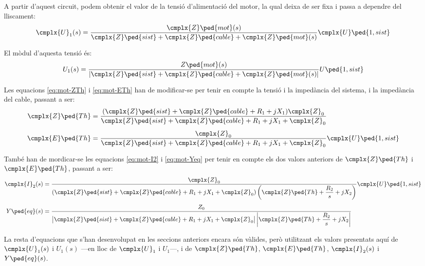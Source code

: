 A partir d'aquest circuit, podem obtenir  el valor de la tensió d'alimentació del motor, la qual deixa de ser fixa i passa a dependre del  lliscament:
\begin{equation}
	\cmplx{U}_1(s) = \frac{\cmplx{Z}\ped{mot}(s)}{\cmplx{Z}\ped{sist} + \cmplx{Z}\ped{cable} +  \cmplx{Z}\ped{mot}(s)} \cmplx{U}\ped{1,sist}\label{eq:mot-U-redu}
\end{equation}

El mòdul d'aquesta tensió és:
\begin{equation}
	U_1(s) = \frac{Z\ped{mot}(s)}{|\cmplx{Z}\ped{sist} + \cmplx{Z}\ped{cable} +  \cmplx{Z}\ped{mot}(s)|} U\ped{1,sist}
\end{equation}

Les equacions \eqref{eq:mot-ZTh} i  \eqref{eq:mot-ETh} han de modificar-se per tenir en compte la tensió i la impedància del sistema, i la impedància del cable, passant a ser:
\begin{subequations}
	\begin{align}
		\cmplx{Z}\ped{Th} &= \frac{(\cmplx{Z}\ped{sist} + \cmplx{Z}\ped{cable} + R_1 + j X_1) \cmplx{Z}_0}{\cmplx{Z}\ped{sist} + \cmplx{Z}\ped{cable} + R_1 + j X_1 + \cmplx{Z}_0} \label{eq:mot-ZTh-redu}\\[1ex]
		\cmplx{E}\ped{Th} &= \frac{\cmplx{Z}_0}{\cmplx{Z}\ped{sist} + \cmplx{Z}\ped{cable} + R_1 + j X_1 + \cmplx{Z}_0} \cmplx{U}\ped{1,sist} \label{eq:mot-ETh-redu}
	\end{align}
\end{subequations}

També han de mordicar-se les equacions \eqref{eq:mot-I2} i \eqref{eq:mot-Yeq} per tenir en compte els dos valors anteriors de $\cmplx{Z}\ped{Th}$ i $\cmplx{E}\ped{Th}$, passant a ser:
\begin{align}
	\cmplx{I}_2(s) &= \frac{\cmplx{Z}_0}{(\cmplx{Z}\ped{sist} + \cmplx{Z}\ped{cable} + R_1 + j X_1 + \cmplx{Z}_0)\left(\cmplx{Z}\ped{Th} + \dfrac{R_2}{s} + j X_2\right)} \cmplx{U}\ped{1,sist} \\[1ex]
	Y\ped{eq}(s) &= \frac{Z_0}{\big|\cmplx{Z}\ped{sist} + \cmplx{Z}\ped{cable} + R_1 + j X_1 + \cmplx{Z}_0\big|\left|\cmplx{Z}\ped{Th} + \dfrac{R_2}{s} + j X_2\right|} \label{eq:mot-Yeq-redu}
\end{align}

La resta d'equacions que s'han desenvolupat en les seccions anteriors encara són vàlides, però utilitzant els valors presentats aquí de $\cmplx{U}_1(s)$ i $U_1(s)$ ---en lloc de  $\cmplx{U}_1$ i  $U_1$---, i de $\cmplx{Z}\ped{Th}$, $\cmplx{E}\ped{Th}$, $\cmplx{I}_2(s)$ i $Y\ped{eq}(s)$. 


